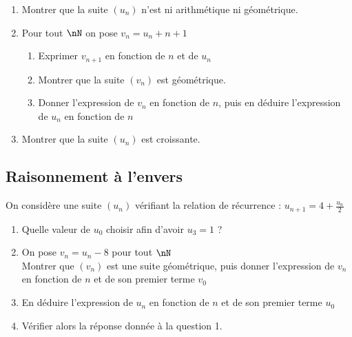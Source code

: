 \documentclass[oneside,12pt]{book}          %
\begin{document}
\begin{enumerate}
    \item Montrer que la suite $(u_n)$ n'est ni arithmétique ni géométrique.
    \item Pour tout $\nN$ on pose $v_n=u_n+n+1$
    \begin{enumerate}
        \item Exprimer $v_{n+1}$ en fonction de $n$ et de $u_n$
        \item Montrer que la suite $(v_n)$ est géométrique.
        \item Donner l'expression de $v_n$ en fonction de $n$, puis en déduire l'expression de $u_n$ en fonction de $n$
    \end{enumerate}
    \item Montrer que la suite $(u_n)$ est croissante.
\end{enumerate}



\subsection{Raisonnement à l'envers}
On considère une suite $(u_n)$ vérifiant la relation de récurrence : $u_{n+1}=4+\frac{u_n}{2}$
\begin{enumerate}
    \item Quelle valeur de $u_{0}$ choisir afin d'avoir $u_{3}=1$ ?
    \item On pose $v_n=u_n-8$ pour tout $\nN$ \\
    Montrer que $(v_n)$ est une suite géométrique, puis donner l'expression de $v_{n}$ en fonction de $n$ et de son premier terme $v_{0}$ 
    \item En déduire l'expression de $u_n$ en fonction de $n$ et de son premier terme $u_{0}$
    \item Vérifier alors la réponse donnée à la question 1.
\end{enumerate}
\end{document}
